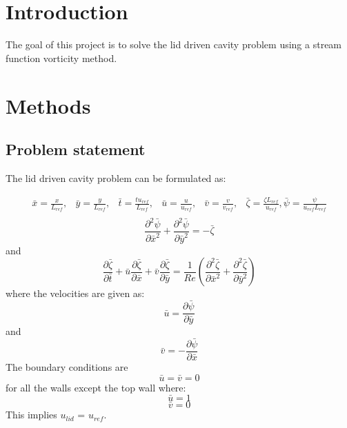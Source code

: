 \section{Introduction}
%
The goal of this project is to solve the lid driven cavity problem using a stream function vorticity method. 

\section{Methods}
%
\subsection{Problem statement}
The lid driven cavity problem can be formulated as:

\begin{align*}
\bar{x} = \frac{x}{L_{ref}}, & \bar{y} = \frac{y}{L_{ref}}, & \bar{t}= \frac{t u_{ref}}{L_{ref}} , & \bar{u}=\frac{u}{u_{ref}} , & \bar{v}=\frac{v}{v_{ref}},& \bar{\zeta} = \frac{\zeta L_{ref}}{u_{ref}}, \bar{\psi} = \frac{\psi}{u_{ref} L_{ref}} \\
\end{align*}
\begin{equation}
\frac{\partial^2 \bar{\psi}}{\partial \bar{x}^2} + \frac{\partial^2 \bar{\psi}}{\partial \bar{y}^2}=-\bar{\zeta}
\end{equation}
and
\begin{equation}
\frac{\partial \bar{\zeta}}{\partial \bar{t}} + \bar{u} \frac{\partial \bar{\zeta}}{\partial \bar{x}} + \bar{v} \frac{\partial \bar{\zeta}}{\partial \bar{y}} = \frac{1}{Re} \left( \frac{\partial^2 \bar{\zeta}}{\partial \bar{x}^2} + \frac{\partial^2 \bar{\zeta}}{\partial \bar{y}^2} \right)
\end{equation}
where the velocities are given as:
\begin{equation}
\bar{u} = \frac{\partial \bar{\psi}}{\partial \bar{y}}
\end{equation}
and
\begin{equation}
\bar{v} = -\frac{\partial \bar{\psi}}{\partial \bar{x}}
\end{equation}
The boundary conditions are 
\begin{equation}
\bar{u} = \bar{v} = 0
\end{equation}
for all the walls except the top wall where:
\begin{equation}
\bar{u} = 1 
\end{equation}
\begin{equation}
\bar{v} = 0
\end{equation}
This implies $u_{lid}$ = $u_{ref}$. 
